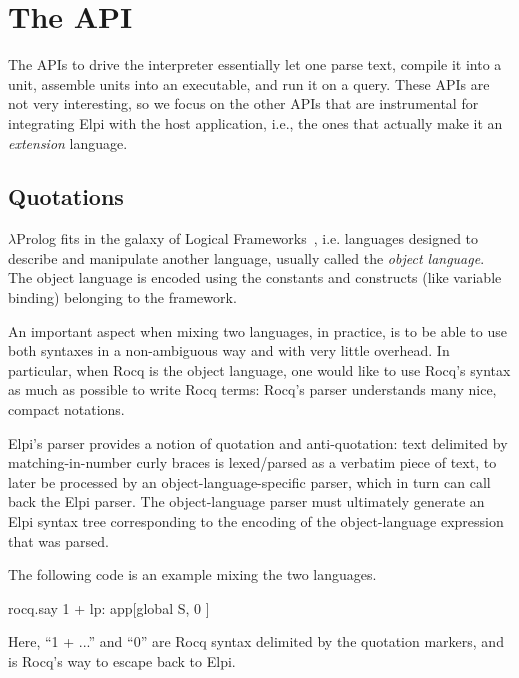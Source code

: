 \documentclass[a4paper, 11pt]{book}
\begin{document}
\section{The API}\label{sec:API}


The APIs to drive the interpreter essentially let one parse text, compile it
into a unit, assemble units into an executable, and run it on a query. These
APIs are not very interesting, so we focus on the other APIs that are
instrumental for integrating Elpi with the host application, i.e., the ones
that actually make it an \emph{extension} language.

\subsection{Quotations}\label{sec:quotations}

$\lambda$Prolog fits in the galaxy of Logical Frameworks~\cite{HarperHP87},
i.e. languages designed to describe and manipulate another language,
usually called the \emph{object language}. The object language is encoded
using the constants and constructs (like variable binding) belonging to the
framework.


An important aspect when mixing two languages, in practice, is to be able to
use both syntaxes in a non-ambiguous way and with very little overhead. In
particular, when Rocq is the object language, one would like to use Rocq's
syntax as much as possible to write Rocq terms: Rocq's parser understands many
nice, compact notations.


Elpi's parser provides a notion of quotation and anti-quotation: text delimited
by matching-in-number curly braces is lexed/parsed as a verbatim piece of text,
to later be processed by an object-language-specific parser, which in turn can
call back the Elpi parser. The object-language parser must ultimately generate
an Elpi syntax tree corresponding to the encoding of the object-language
expression that was parsed.

The following code is an example mixing the two languages.

\begin{elpicode}
  rocq.say {{ 1 + lp:{{ app[global S, {{ 0  }} ]  }}    }}
\end{elpicode}

\noindent

Here, ``1 + ...'' and ``0'' are Rocq syntax delimited by the quotation
markers, and  is Rocq's way to escape back to Elpi.
\end{document}
